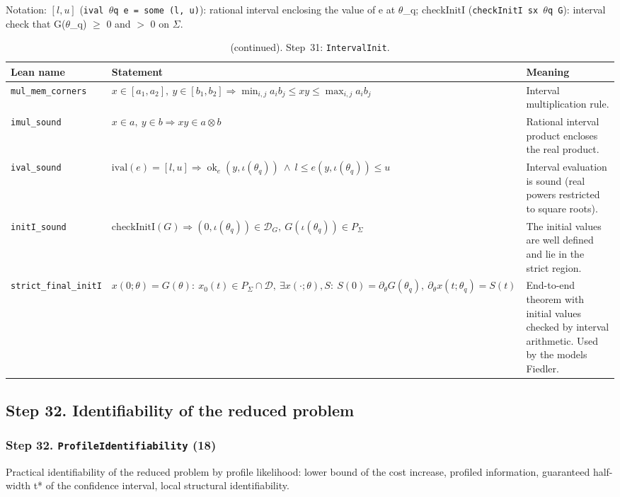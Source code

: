{\small\raggedright Notation: $[l,u]$ (\texttt{ival $\theta$q e = some (l, u)}): rational interval enclosing the value of e at $\theta$\_q; $\mathrm{checkInitI}$ (\texttt{checkInitI sx $\theta$q G}): interval check that G($\theta$\_q) $\ge$ 0 and $>$ 0 on $\Sigma$.}

\addtocounter{table}{-1}
{\small
\begin{longtable}{@{}>{\raggedright\arraybackslash}p{3.6cm}>{\raggedright\arraybackslash}p{6.6cm}>{\raggedright\arraybackslash}p{5.6cm}@{}}
\caption[]{(continued). Step~31: \texttt{IntervalInit}.}\\
\toprule
Lean name & Statement & Meaning \\
\midrule
\endhead
\texttt{mul\_\allowbreak{}mem\_\allowbreak{}corners} & $\displaystyle x\in[a_1,a_2],\ y\in[b_1,b_2]\Rightarrow\min_{i,j}a_ib_j\le xy\le\max_{i,j}a_ib_j$ & Interval multiplication rule. \\[3pt]
\texttt{imul\_\allowbreak{}sound} & $\displaystyle x\in a,\ y\in b\Rightarrow xy\in a\otimes b$ & Rational interval product encloses the real product. \\[3pt]
\texttt{ival\_\allowbreak{}sound} & $\displaystyle \mathrm{ival}(e)=[l,u]\Rightarrow\operatorname{ok}_e(y,\iota(\theta_q))\ \wedge\ l\le e(y,\iota(\theta_q))\le u$ & Interval evaluation is sound (real powers restricted to square roots). \\[3pt]
\texttt{initI\_\allowbreak{}sound} & $\displaystyle \mathrm{checkInitI}(G)\Rightarrow(0,\iota(\theta_q))\in\mathcal D_G,\ G(\iota(\theta_q))\in P_\Sigma$ & The initial values are well defined and lie in the strict region. \\[3pt]
\texttt{strict\_\allowbreak{}final\_\allowbreak{}initI} & $\displaystyle x(0;\theta)=G(\theta):\ x_0(t)\in P_\Sigma\cap\mathcal D,\ \exists x(\cdot;\theta),S:\ S(0)=\partial_\theta G(\theta_q),\ \partial_\theta x(t;\theta_q)=S(t)$ & End-to-end theorem with initial values checked by interval arithmetic. Used by the models Fiedler. \\[3pt]
\bottomrule
\end{longtable}
}

\subsection*{Step 32. Identifiability of the reduced problem}

\subsubsection*{Step 32. \texttt{ProfileIdentifiability} (18)}
Practical identifiability of the reduced problem by profile likelihood: lower bound of the cost increase, profiled information, guaranteed half-width t* of the confidence interval, local structural identifiability.

